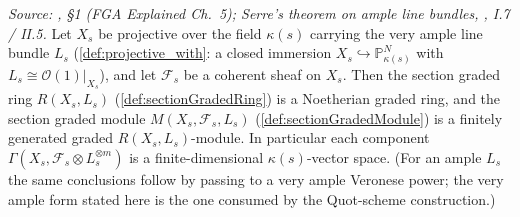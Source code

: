 \begin{lemma}
  \label{lem:sectionGradedModule_fg}
  \leanok
  \textit{Source: \cite{nitsure-hilbert-quot}, \S 1 (FGA Explained Ch.~5); Serre's theorem on
  ample line bundles, \cite{hartshorne-ag}, I.7 / II.5.}
  Let \(X_s\) be projective over the field \(\kappa(s)\) carrying the very
  ample line bundle \(L_s\) (\cref{def:projective_with}: a closed immersion
  \(X_s \hookrightarrow \mathbb{P}^N_{\kappa(s)}\) with
  \(L_s \cong \mathcal{O}(1)|_{X_s}\)), and let \(\mathcal{F}_s\) be a
  coherent sheaf on \(X_s\).
  Then the section graded ring \(R(X_s, L_s)\) (\cref{def:sectionGradedRing}) is a
  Noetherian graded ring, and the section graded module
  \(M(X_s, \mathcal{F}_s, L_s)\) (\cref{def:sectionGradedModule}) is a finitely
  generated graded \(R(X_s, L_s)\)-module. In particular each component
  \(\Gamma(X_s, \mathcal{F}_s \otimes L_s^{\otimes m})\) is a finite-dimensional
  \(\kappa(s)\)-vector space.
  (For an ample \(L_s\) the same conclusions follow by passing to a very
  ample Veronese power; the very ample form stated here is the one consumed
  by the Quot-scheme construction.)
\end{lemma}

